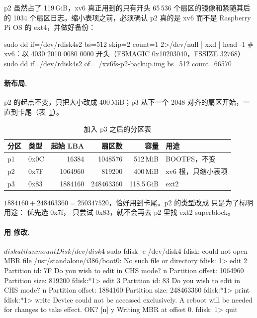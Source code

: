 p2 虽然占了 119\,GiB，xv6 真正用到的只有开头 65\,536 个扇区的镜像和紧随其后的 1034 个扇区日志。缩小表项之前，必须确认 p2 真的是 xv6 而不是 Raspberry Pi OS 的 ext4，并做好备份：

\begin{shcode}
sudo dd if=/dev/rdisk4s2 bs=512 skip=2 count=1 2>/dev/null | xxd | head -1
# xv6：以 4030 2010 0080 0000 开头（FSMAGIC 0x10203040，FSSIZE 32768）
sudo dd if=/dev/rdisk4s2 of=~/xv6fs-p2-backup.img bs=512 count=66570
\end{shcode}

\paragraph{新布局.} p2 的起点不变，只把大小改成 400\,MiB；p3 从下一个 2048 对齐的扇区开始，一直到卡尾（表~\ref{tab:ext2-parts}）。

\begin{table}[htbp]
  \centering
  \caption{加入 p3 之后的分区表}
  \label{tab:ext2-parts}
  \small
  \begin{tabular}{@{}llrrrl@{}}
    \toprule
    分区 & 类型 & 起始 LBA & 扇区数 & 容量 & 用途 \\
    \midrule
    p1 & 0x0C & 16384 & 1048576 & 512\,MiB & BOOTFS，不变 \\
    p2 & 0x7F & 1064960 & 819200 & 400\,MiB & xv6 根，只缩小表项 \\
    p3 & 0x83 & 1884160 & 248463360 & 118.5\,GiB & ext2 \\
    \bottomrule
  \end{tabular}
\end{table}

$1884160 + 248463360 = 250347520$，恰好用到卡尾。p2 的类型改成  只是为了标明用途： 优先选 0x7f， 只尝试 0x83，就不会再去 p2 里找 ext2 superblock。

\paragraph{用  修改.}

\begin{txtcode}
$ diskutil unmountDisk /dev/disk4
$ sudo fdisk -e /dev/disk4
fdisk: could not open MBR file /usr/standalone/i386/boot0: No such file or directory
fdisk: 1> edit 2
         Partition id: 7F
         Do you wish to edit in CHS mode? n
         Partition offset: 1064960
         Partition size: 819200
fdisk:*1> edit 3
         Partition id: 83
         Do you wish to edit in CHS mode? n
         Partition offset: 1884160
         Partition size: 248463360
fdisk:*1> print
fdisk:*1> write
Device could not be accessed exclusively.
A reboot will be needed for changes to take effect. OK? [n] y
Writing MBR at offset 0.
fdisk: 1> quit
\end{txtcode}

